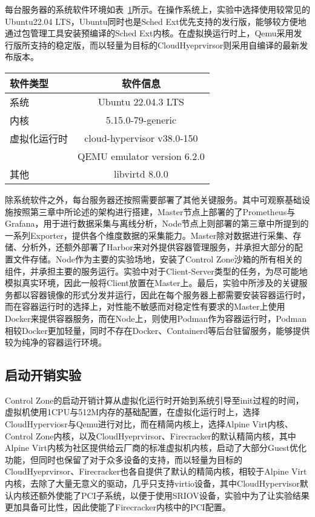 每台服务器的系统软件环境如表~\ref{tab:system_env}所示。在操作系统上，实验中选择使用较常见的Ubuntu22.04 LTS，Ubuntu同时也是Sched Ext优先支持的发行版，能够较方便地通过包管理工具安装预编译的Sched Ext内核。在虚拟换运行时上，Qemu采用发行版所支持的稳定版，而以轻量为目标的CloudHyeprvirsor则采用自编译的最新发布版本。

\begin{table}[H]
    \label{tab:system_env}
    \footnotesize%
    \setlength{\tabcolsep}{30pt}%
    \renewcommand{\arraystretch}{1.25}%
    \centering
    \begin{tabular}{lc}
        \hline
        软件类型 & 软件信息 \\
        \hline
        系统 & Ubuntu 22.04.3 LTS  \\
        内核 & 5.15.0-79-generic \\
        虚拟化运行时 & cloud-hypervisor v38.0-150 \\
                   & QEMU emulator version 6.2.0 \\
        其他        & libvirtd 8.0.0 \\
        \hline
    \end{tabular}
\end{table}

除系统软件之外，每台服务器还按照需要部署了其他关键服务。其中可观察基础设施按照第三章中所论述的架构进行搭建，Master节点上部署的了Prometheus与Grafana，用于进行数据采集与离线分析，Node节点上则部署的第三章中所提到的一系列Exporter，提供各个维度数据的采集能力。Master除对数据进行采集、存储、分析外，还额外部署了Harbor来对外提供容器管理服务，并承担大部分的配置文件存储。Node作为主要的实验场地，安装了Control Zone沙箱的所有相关的组件，并承担主要的服务运行。实验中对于Client-Server类型的任务，为尽可能地模拟真实环境，因此一般将Client放置在Master上。最后，实验中所涉及的关键服务都以容器镜像的形式分发并运行，因此在每个服务器上都需要安装容器运行时，而在容器运行时的选择上，对性能不敏感而对稳定性有要求的Master上使用Docker来提供容器服务，而在Node上，则使用Podman作为容器运行时，Podman相较Docker更加轻量，同时不存在Docker、Containerd等后台驻留服务，能够提供较为纯净的容器运行环境。

\subsection{启动开销实验}

Control Zone的启动开销计算从虚拟化运行时开始到系统引导至init过程的时间，虚拟机使用1CPU与512M内存的基础配置，在虚拟化运行时上，选择CloudHyperviosr与Qemu进行对比，而在精简内核上，选择Alpine Virt内核、Control Zone内核，以及CloudHyeprvirsor、Firecracker的默认精简内核，其中Alpine Virt内核为社区提供给云厂商的标准虚拟机内核，启动了大部分Guest优化功能，但同时也保留了对于众多设备的支持，而以轻量为目标的CloudHyeprvirsor、Firecracker也各自提供了默认的精简内核，相较于Alpine Virt内核，去除了大量无意义的驱动，几乎只支持virtio设备，其中CloudHypervisor默认内核还额外使能了PCI子系统，以便于使用SRIOV设备，实验中为了让实验结果更加具备可比性，因此使能了Firecracker内核中的PCI配置。

